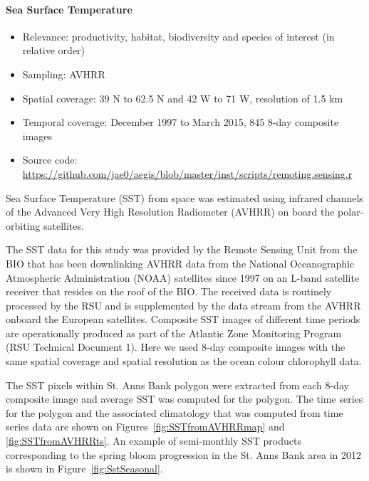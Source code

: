 \documentclass[letterpaper,portrait,11pt]{scrartcl}
\numberwithin{equation}{section}    %
\numberwithin{figure}{section}    %
\numberwithin{table}{section}       %
\begin{document}
\afterpage{\clearpage}
\paragraph{Sea Surface Temperature}

\begin{itemize}
  \item Relevance:  productivity, habitat, biodiversity and species of interest (in relative order)
  \item Sampling:  AVHRR
  \item Spatial coverage: 39 N to 62.5 N and 42 W to 71 W, resolution of 1.5 km
  \item Temporal coverage: December 1997 to March 2015, 845 8-day composite images
  \item Source code: \url{https://github.com/jae0/aegis/blob/master/inst/scripts/remoting.sensing.r}
\end{itemize}

Sea Surface Temperature (SST) from space was estimated using infrared channels of the Advanced Very High Resolution Radiometer (AVHRR) on board the polar-orbiting satellites.

The SST data for this study was provided by the Remote Sensing Unit from the BIO that has been downlinking AVHRR data from the National Oceanographic Atmospheric Administration (NOAA) satellites since 1997 on an L-band satellite receiver that resides on the roof of the BIO. The received data is routinely processed by the RSU and is supplemented by the data stream from the AVHRR onboard the European satellites. Composite SST images of different time periods are operationally produced as part of the Atlantic Zone Monitoring Program (RSU Technical Document 1). Here we used 8-day composite images with the same spatial coverage and spatial resolution as the ocean colour chlorophyll data.

The SST pixels within St. Anns Bank polygon were extracted from each 8-day composite image and average SST was computed for the polygon. The time series for the polygon and the associated climatology that was computed from time series data are shown on Figures~\ref{fig:SSTfromAVHRRmap} and \ref{fig:SSTfromAVHRRts}. An example of semi-monthly SST products corresponding to the spring bloom progression in the St. Anns Bank area in 2012 is shown in Figure~\ref{fig:SstSeasonal}.
\end{document}
